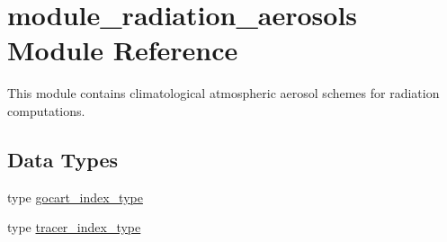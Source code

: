 \hypertarget{namespacemodule__radiation__aerosols}{}\section{module\+\_\+radiation\+\_\+aerosols Module Reference}
\label{namespacemodule__radiation__aerosols}


This module contains climatological atmospheric aerosol schemes for radiation computations.  


\subsection*{Data Types}
\begin{DoxyCompactItemize}
\item 
type \hyperlink{structmodule__radiation__aerosols_1_1gocart__index__type}{gocart\+\_\+index\+\_\+type}
\item 
type \hyperlink{structmodule__radiation__aerosols_1_1tracer__index__type}{tracer\+\_\+index\+\_\+type}
\end{DoxyCompactItemize}
